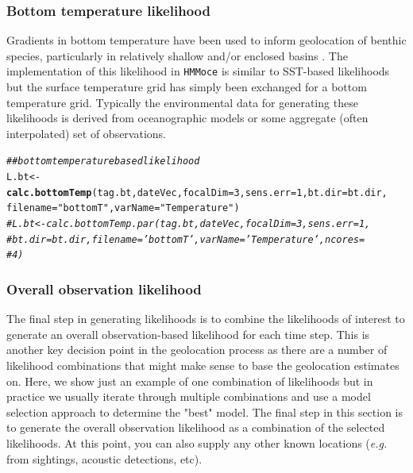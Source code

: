 \documentclass{article}\usepackage[]{graphicx}\usepackage[]{color}
\makeatletter
\newcommand{\hlnum}[1]{\textcolor[rgb]{0.686,0.059,0.569}{#1}}%
\newcommand{\hlstr}[1]{\textcolor[rgb]{0.192,0.494,0.8}{#1}}%
\newcommand{\hlcom}[1]{\textcolor[rgb]{0.678,0.584,0.686}{\textit{#1}}}%
\newcommand{\hlstd}[1]{\textcolor[rgb]{0.345,0.345,0.345}{#1}}%
\newcommand{\hlkwb}[1]{\textcolor[rgb]{0.69,0.353,0.396}{#1}}%
\newcommand{\hlkwc}[1]{\textcolor[rgb]{0.333,0.667,0.333}{#1}}%
\newcommand{\hlkwd}[1]{\textcolor[rgb]{0.737,0.353,0.396}{\textbf{#1}}}%
\newenvironment{kframe}{%
 \def\at@end@of@kframe{}%
 \ifinner\ifhmode%
  \def\at@end@of@kframe{\end{minipage}}%
  \begin{minipage}{\columnwidth}%
 \fi\fi%
 \def\FrameCommand##1{\hskip\@totalleftmargin \hskip-\fboxsep
 \colorbox{shadecolor}{##1}\hskip-\fboxsep
     \hskip-\linewidth \hskip-\@totalleftmargin \hskip\columnwidth}%
 \MakeFramed {\advance\hsize-\width
   \@totalleftmargin\z@ \linewidth\hsize
   \@setminipage}}%
 {\par\unskip\endMakeFramed%
 \at@end@of@kframe}
\newenvironment{knitrout}{}{} %
\newcommand{\eg}{\textit{e.g.} }
\makeatother
\begin{document}
\subsubsection{Bottom temperature likelihood}
Gradients in bottom temperature have been used to inform geolocation of benthic species, particularly in relatively shallow and/or enclosed basins \citep[\eg cod][]{LeBris2013}. The implementation of this likelihood in \texttt{HMMoce} is similar to SST-based likelihoods but the surface temperature grid has simply been exchanged for a bottom temperature grid. Typically the environmental data for generating these likelihoods is derived from oceanographic models or some aggregate (often interpolated) set of observations.

\begin{knitrout}\small
{}\color{fgcolor}\begin{kframe}
\begin{alltt}
\hlcom{## bottom temperature based likelihood}
\hlstd{L.bt} \hlkwb{<-} \hlkwd{calc.bottomTemp}\hlstd{(tag.bt, dateVec,} \hlkwc{focalDim} \hlstd{=} \hlnum{3}\hlstd{,} \hlkwc{sens.err} \hlstd{=} \hlnum{1}\hlstd{,} \hlkwc{bt.dir} \hlstd{= bt.dir,}
    \hlkwc{filename} \hlstd{=} \hlstr{"bottomT"}\hlstd{,} \hlkwc{varName} \hlstd{=} \hlstr{"Temperature"}\hlstd{)}
\hlcom{# L.bt <- calc.bottomTemp.par(tag.bt, dateVec, focalDim = 3, sens.err = 1,}
\hlcom{# bt.dir = bt.dir, filename = 'bottomT', varName = 'Temperature', ncores =}
\hlcom{# 4)}
\end{alltt}
\end{kframe}
\end{knitrout}


\subsubsection{Overall observation likelihood}

The final step in generating likelihoods is to combine the likelihoods of interest to generate an overall observation-based likelihood for each time step. This is another key decision point in the geolocation process as there are a number of likelihood combinations that might make sense to base the geolocation estimates on. Here, we show just an example of one combination of likelihoods but in practice we usually iterate through multiple combinations and use a model selection approach to determine the "best" model. The final step in this section is to generate the overall observation likelihood as a combination of the selected likelihoods. At this point, you can also supply any other known locations (\eg from sightings, acoustic detections, etc).
\end{document}
